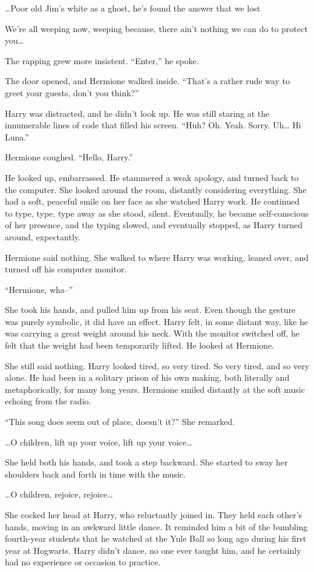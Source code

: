 …Poor old Jim’s white as a ghost, he’s found the answer that we lost

We’re all weeping now, weeping because, there ain’t nothing we can do to protect you…

The rapping grew more insistent. “Enter,” he spoke.

The door opened, and Hermione walked inside. “That’s a rather rude way to greet your guests, don’t you think?”

Harry was distracted, and he didn’t look up. He was still staring at the innumerable lines of code that filled his screen. “Huh? Oh. Yeah. Sorry. Uh… Hi Luna.”

Hermione coughed. “Hello, Harry.”

He looked up, embarrassed. He stammered a weak apology, and turned back to the computer. She looked around the room, distantly considering everything. She had a soft, peaceful smile on her face as she watched Harry work. He continued to type, type, type away as she stood, silent. Eventually, he became self-conscious of her presence, and the typing slowed, and eventually stopped, as Harry turned around, expectantly.

Hermione said nothing. She walked to where Harry was working, leaned over, and turned off his computer monitor.

“Hermione, wha–”

She took his hands, and pulled him up from his seat. Even though the gesture was purely symbolic, it did have an effect. Harry felt, in some distant way, like he was carrying a great weight around his neck. With the monitor switched off, he felt that the weight had been temporarily lifted. He looked at Hermione.

She still said nothing. Harry looked tired, so very tired. So very tired, and so very alone. He had been in a solitary prison of his own making, both literally and metaphorically, for many long years. Hermione smiled distantly at the soft music echoing from the radio.

“This song does seem out of place, doesn’t it?” She remarked.

…O children, lift up your voice, lift up your voice…

She held both his hands, and took a step backward. She started to sway her shoulders back and forth in time with the music.

…O children, rejoice, rejoice…

She cocked her head at Harry, who reluctantly joined in. They held each other’s hands, moving in an awkward little dance. It reminded him a bit of the bumbling fourth-year students that he watched at the Yule Ball so long ago during his first year at Hogwarts. Harry didn’t dance, no one ever taught him, and he certainly had no experience or occasion to practice.

